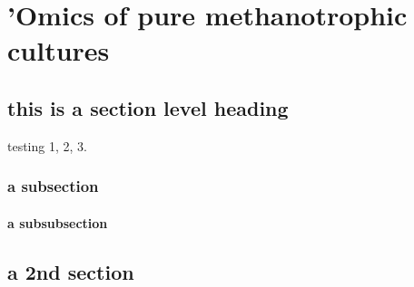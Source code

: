 \chapter{'Omics of pure methanotrophic cultures}

\section{this is a section level heading}
testing 1, 2, 3.

\subsection{a subsection}

\subsubsection{a subsubsection}

\section{a 2nd section}



